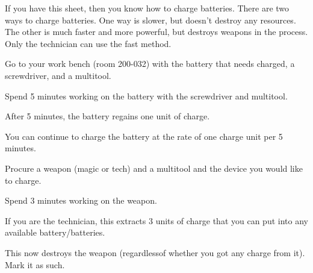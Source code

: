 \documentclass[green]{guildcamp3}
\begin{document}
\name{\gBatterycharge{}}



If you have this sheet, then you know how to charge batteries. There are two ways to charge batteries. One way is slower, but doesn't destroy any resources. The other is much faster and more powerful, but destroys weapons in the process. Only the technician can use the fast method. 


\begin{enum}
  \item Go to your work bench (room 200-032) with the battery that needs charged, a screwdriver, and a multitool.
  \item Spend 5 minutes working on the battery with the screwdriver and multitool.
  \item After 5 minutes, the battery regains one unit of charge.
  \item You can continue to charge the battery at the rate of one charge unit per 5 minutes. 
\end{enum}

\begin{enum}
	\item Procure a weapon (magic or tech) and a multitool and the device you would like to charge.
	\item Spend 3 minutes working on the weapon. 
	\item If you are the technician, this extracts 3 units of charge that you can put into any available battery/batteries. 
	\item This now destroys the weapon (regardlessof whether you got any charge from it). Mark it as such. 
\end{enum}
\end{document}
